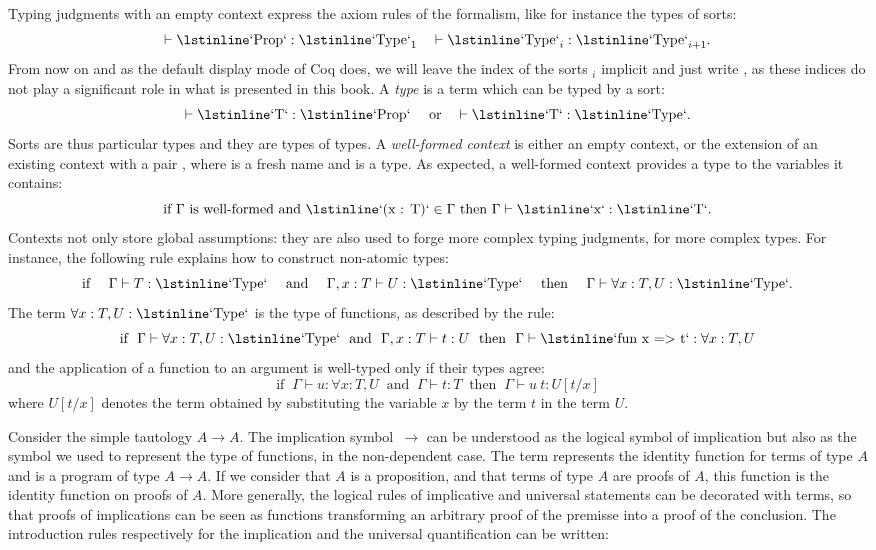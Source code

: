 Typing judgments with an empty context express the
axiom rules of the formalism, like for instance the types of sorts:
$$\vdash \C{Prop} : \C{Type}_1 \quad \vdash \C{Type}_i : \C{Type}_{i+1}.$$
From now on and as the default display mode of Coq does, we will leave
the index of the sorts $_i$ implicit and just write ,
as these indices do not play a significant role in what is presented
in this book. A \emph{type} is a term which can be typed by a sort:
$$\vdash \C{T} : \C{Prop} \quad \textrm{ or}
\quad \vdash \C{T} : \C{Type}.$$
Sorts are thus particular types and they are types of types.
A \emph{well-formed context} is either an empty context, or the
extension of an existing context with a pair , where 
is a fresh name and  is a type. As expected, a well-formed
context provides a type to the variables it contains:
$$\textrm{if } \Gamma \textrm{ is well-formed  and }
\C{(x : T)} \in \Gamma \textrm{ then }
\Gamma \vdash \C{x} : \C{T}.$$
Contexts not only store global assumptions: they are also used to
forge more complex typing judgments, for more complex types. For
instance, the following rule explains how to construct non-atomic
types:
$$\textrm{if }\quad \Gamma \vdash T : \C{Type} \quad\textrm{ and }\quad
\Gamma, x : T \vdash U : \C{Type} \quad\textrm{ then }\quad
\Gamma \vdash \forall x : T, U : \C{Type}.$$
The term $ \forall x : T, U : \C{Type}$ is the type of functions, as
described by the rule:
$$\textrm{if } \ \Gamma \vdash \forall x : T, U : \C{Type}
\ \textrm{ and }\
\Gamma, x : T \vdash t : U
\ \textrm{ then }\
\Gamma \vdash \C{fun x => t} : \forall x : T, U
$$
and the application of a function to an argument is well-typed only if
their types agree:
$$\textrm{if } \ \Gamma \vdash u : \forall x : T, U
\ \textrm{ and }\
\Gamma \vdash t : T
\ \textrm{ then }\
\Gamma \vdash u\ t : U[t/x]
$$
where $U[t/x]$ denotes the term obtained by substituting
the variable $x$ by the term $t$ in the term $U$.

Consider the simple tautology $A \rightarrow A$.
The implication symbol~$\to$ can be understood as the logical symbol
of implication but also as the symbol we used
to represent the type of functions, in the non-dependent case. The
term \C{(fun x : A => x)} represents the identity function for terms
of type $A$ and is a program of type $A \rightarrow A$. If we consider
that $A$ is a proposition, and that terms of type $A$ are proofs of
$A$, this function is the identity function on proofs of $A$.
More generally, the logical rules of implicative and universal
statements can be decorated with terms, so that proofs of implications
can be seen as functions transforming an arbitrary proof of the
premisse into a proof of the conclusion. The introduction rules
respectively for the implication and the universal quantification can
be written:

